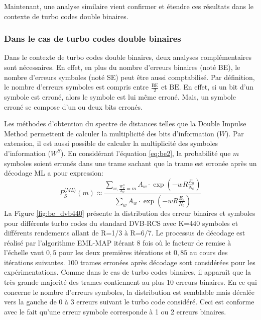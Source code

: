 Maintenant, une analyse similaire vient confirmer et étendre ces résultats dans le contexte de turbo codes double binaires.

\subsubsection{Dans le cas de turbo codes double binaires}
Dans le contexte de turbo codes double binaires, deux analyses complémentaires sont nécessaires. En effet, en plus du 
nombre d'erreurs binaires (noté BE), le nombre d'erreurs symboles (noté SE) peut être aussi comptabilisé. Par définition, 
le nombre d'erreurs symboles est compris entre $\frac{\text{BE}}{2} $ et $\text{BE}$. En effet, si un bit d'un symbole 
est erroné, alors le symbole est lui même erroné. Mais, un symbole erroné se compose d'un ou deux bits erronés.

Les méthodes d'obtention du spectre de distances telles que la Double Impulse Method permettent de calculer la multiplicité 
des bits d'information ($W$). Par extension, il est aussi possible de calculer la multiplicité des symboles d'information
($W^S$). En considérant l'équation \ref{eq:be2}, la probabilité que $m$ symboles soient erronés dans une trame sachant 
que la trame est erronée après un décodage ML a pour expression: 
\begin{equation}
P_S^{\langle ML\rangle}(m) \approx \frac{\displaystyle\sum\limits_{w, \frac{W^S_w}{A_w}=m} A_w\cdot \exp\left(-w R \frac{E_b}{N_0}\right)}
                  {\displaystyle\sum\limits_{w} A_w\cdot \exp\left(-w R \frac{E_b}{N_0}\right)}
\label{eq:se}
\end{equation}
La Figure \ref{fig:be_dvb440} présente la distribution des erreur binaires et symboles pour différents turbo codes du 
standard DVB-RCS avec K=440 symboles et différents rendements allant de R=1/3 à R=6/7. Le processus de décodage est réalisé par
l'algorithme EML-MAP itérant 8 fois où le facteur de remise à l'échelle vaut $0,5$ pour les deux premières itérations et $0,85$ 
au cours des itérations suivantes. 100 trames erronées après décodage sont considérées pour les expérimentations. Comme 
dans le cas de turbo codes 
binaires, il apparaît que la très grande majorité des trames contiennent au plus 10 erreurs binaires. En ce qui concerne 
le nombre d'erreurs symboles, la distribution est semblable mais décalée vers la gauche de 0 à 3 erreurs suivant le turbo 
code considéré. Ceci est conforme avec le fait qu'une erreur symbole corresponde à 1 ou 2 erreurs binaires. 

